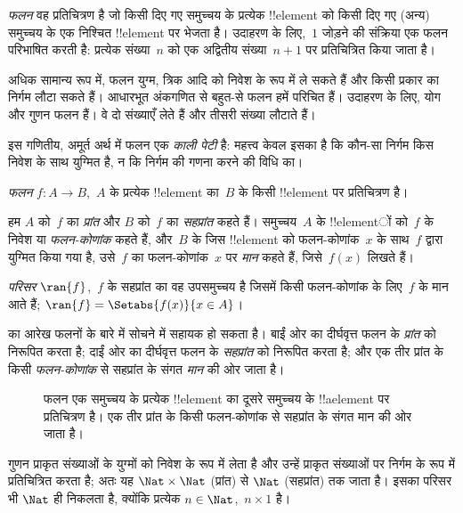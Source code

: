 \documentclass[../../../include/open-logic-section]{subfiles}
\begin{document}

\begin{explain}
\emph{फलन} वह प्रतिचित्रण है जो किसी दिए गए समुच्चय के प्रत्येक !!{element}
को किसी दिए गए (अन्य) समुच्चय के एक निश्चित !!{element} पर भेजता है। उदाहरण के
लिए,~$1$ जोड़ने की संक्रिया एक फलन परिभाषित करती है: प्रत्येक संख्या~$n$ को
एक अद्वितीय संख्या~$n+1$ पर प्रतिचित्रित किया जाता है।

अधिक सामान्य रूप में, फलन युग्म, त्रिक आदि को निवेश के रूप में ले सकते हैं और
किसी प्रकार का निर्गम लौटा सकते हैं। आधारभूत अंकगणित से बहुत-से फलन हमें
परिचित हैं। उदाहरण के लिए, योग और गुणन फलन हैं। वे दो संख्याएँ लेते हैं और
तीसरी संख्या लौटाते हैं।

इस गणितीय, अमूर्त अर्थ में फलन एक \emph{काली पेटी} है: महत्त्व केवल इसका है
कि कौन-सा निर्गम किस निवेश के साथ युग्मित है, न कि निर्गम की गणना करने की विधि
का।
\end{explain}

\begin{defn}[फलन]
\emph{फलन} $f \colon A \to B$,~$A$ के प्रत्येक !!{element} का~$B$ के किसी
!!{element} पर प्रतिचित्रण है।

हम $A$ को~$f$ का \emph{प्रांत} और $B$ को~$f$ का \emph{सहप्रांत} कहते हैं।
समुच्चय~$A$ के !!{element}ों को~$f$ के निवेश या \emph{फलन-कोणांक} कहते हैं,
और~$B$ के जिस !!{element} को फलन-कोणांक~$x$ के साथ~$f$ द्वारा युग्मित किया
गया है, उसे~$f$ का फलन-कोणांक~$x$ पर \emph{मान} कहते हैं, जिसे~$f(x)$ लिखते
हैं।

\emph{परिसर} $\ran{f}$,~$f$ के सहप्रांत का वह उपसमुच्चय है जिसमें किसी
फलन-कोणांक के लिए~$f$ के मान आते हैं; $\ran{f} =
\Setabs{f(x)}{x \in A}$।
\end{defn}

 का आरेख फलनों के बारे में सोचने में सहायक हो सकता है।
बाईं ओर का दीर्घवृत्त फलन के \emph{प्रांत} को निरूपित करता है; दाईं ओर का
दीर्घवृत्त फलन के \emph{सहप्रांत} को निरूपित करता है; और एक तीर प्रांत के
किसी \emph{फलन-कोणांक} से सहप्रांत के संगत \emph{मान} की ओर जाता है।

\begin{figure}[H]
  \caption{फलन एक समुच्चय के प्रत्येक !!{element} का दूसरे समुच्चय के
    !!a{element} पर प्रतिचित्रण है। एक तीर प्रांत के किसी फलन-कोणांक से
    सहप्रांत के संगत मान की ओर जाता है।}
\end{figure}

\begin{ex}
गुणन प्राकृत संख्याओं के युग्मों को निवेश के रूप में लेता है और उन्हें
प्राकृत संख्याओं पर निर्गम के रूप में प्रतिचित्रित करता है; अतः यह
$\Nat \times \Nat$ (प्रांत) से $\Nat$ (सहप्रांत) तक जाता है। इसका परिसर भी
$\Nat$ ही निकलता है, क्योंकि प्रत्येक $n \in \Nat$,~$n \times 1$ है।
\end{ex}
\end{document}
